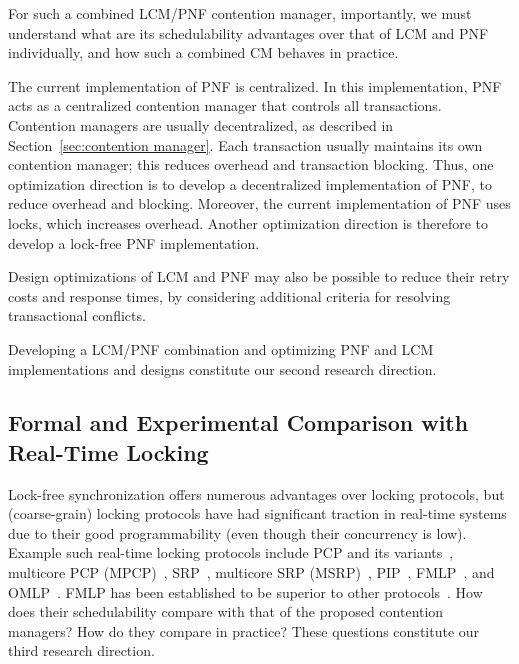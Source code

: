 \documentclass[12pt,english]{report}
\begin{document}
For such a combined LCM/PNF contention manager, importantly, we must  understand what are its schedulability advantages over that of LCM and PNF individually, and how such a combined CM behaves in practice. 


The current implementation of PNF is centralized. In this implementation, PNF acts as a centralized contention manager that controls all transactions. Contention managers are usually decentralized, as described in Section~\ref{sec:contention manager}. Each transaction usually maintains its own contention manager; this reduces overhead and transaction blocking. Thus, one optimization direction is to develop a decentralized implementation of PNF, to reduce overhead and blocking. Moreover, the current implementation of PNF uses locks, which increases overhead. Another optimization direction is therefore to develop a lock-free PNF implementation.


Design optimizations of LCM and PNF may also be possible to reduce their retry costs and response times, by considering additional criteria for resolving transactional conflicts. 

Developing a LCM/PNF combination and optimizing PNF and LCM implementations and designs constitute  our second research direction. 

\subsection{Formal and Experimental Comparison with Real-Time Locking} 

Lock-free synchronization offers numerous advantages over locking protocols, but (coarse-grain) locking protocols have had significant traction in real-time systems due to their good programmability (even though their concurrency is low).  Example such real-time locking protocols include PCP and its variants~\cite{chen1990dynamic,6031129,Rajkumar:1991:SRS:532621,sha1990priority}, multicore PCP (MPCP)~\cite{lakshmanan2009coordinated,rajkumar2002real}, SRP~\cite{Buttazzo:2004:HRC:1027504, baker1991stack}, multicore SRP (MSRP)~\cite{gai2003comparison}, PIP~\cite{easwaran2009resource}, FMLP~\cite{key-4,brandenburg2008implementation,holman2006locking}, and OMLP~\cite{Baruah:2007:TMG:1338441.1338647}. FMLP has been established to be superior to other protocols~\cite{brandenburg2008comparison}. How does their schedulability compare with that of the proposed contention managers? How do they compare in practice? These questions constitute our third research direction. 
\end{document}
